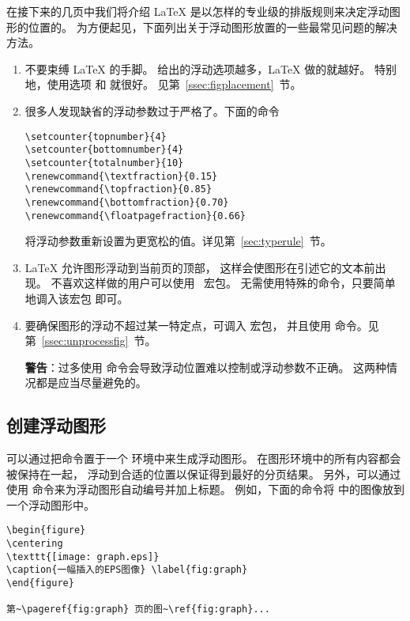 在接下来的几页中我们将介绍 \LaTeX{} 是以怎样的专业级的排版规则来决定浮动图形的位置的。
为方便起见，下面列出关于浮动图形放置的一些最常见问题的解决方法。
\begin{enumerate}
	\item 不要束缚 \LaTeX{} 的手脚。
	给出的浮动选项越多，\LaTeX{} 做的就越好。
	特别地，使用选项 \opt{[htbp]} 和 \opt{[tbp]}	就很好。
	见第~\ref{ssec:figplacement}~节。
	
	\item 很多人发现缺省的浮动参数过于严格了。下面的命令
\begin{lstlisting}
\setcounter{topnumber}{4}
\setcounter{bottomnumber}{4}
\setcounter{totalnumber}{10}
\renewcommand{\textfraction}{0.15}
\renewcommand{\topfraction}{0.85}
\renewcommand{\bottomfraction}{0.70}
\renewcommand{\floatpagefraction}{0.66}
\end{lstlisting}
	将浮动参数重新设置为更宽松的值。详见第~\ref{sec:typerule}~节。
	
	\item \LaTeX{} 允许图形浮动到当前页的顶部，
	这样会使图形在引述它的文本前出现。
	不喜欢这样做的用户可以使用~ 宏包。
	无需使用特殊的命令，只要简单地调入该宏包  即可。
	
	\item 要确保图形的浮动不超过某一特定点，可调入  宏包，
	并且使用  命令。见第~\ref{ssec:unprocessfig}~节。
	
	\textbf{警告}：过多使用 	命令会导致浮动位置难以控制或浮动参数不正确。
	这两种情况都是应当尽量避免的。
\end{enumerate}

\subsection{创建浮动图形}\label{ssec:createfloatfig}
可以通过把命令置于一个  环境中来生成浮动图形。
在图形环境中的所有内容都会被保持在一起，
浮动到合适的位置以保证得到最好的分页结果。
另外，可以通过使用  命令来为浮动图形自动编号并加上标题。
例如，下面的命令将  中的图像放到一个浮动图形中。
\begin{lstlisting}
\begin{figure} 
\centering 
\texttt{[image: graph.eps]} 
\caption{一幅插入的EPS图像} \label{fig:graph} 
\end{figure}

第~\pageref{fig:graph} 页的图~\ref{fig:graph}...
\end{lstlisting}

